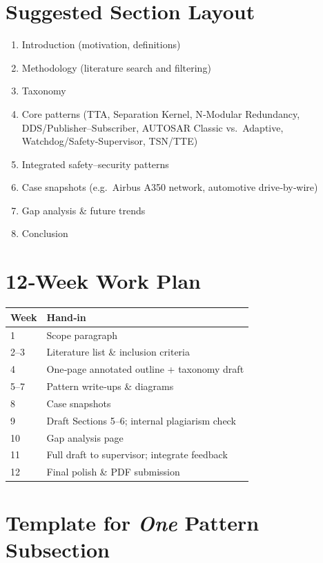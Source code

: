 \documentclass[11pt,a4paper]{article}
\begin{document}
\section{Suggested Section Layout}

\begin{enumerate}[label=\arabic*.]
  \item Introduction (motivation, definitions)
  \item Methodology (literature search and filtering)
  \item Taxonomy
  \item Core patterns (TTA, Separation Kernel, N‑Modular Redundancy, DDS/Publisher--Subscriber, AUTOSAR Classic vs.~Adaptive, Watchdog/Safety‑Supervisor, TSN/TTE)
  \item Integrated safety--security patterns
  \item Case snapshots (e.g.\ Airbus A350 network, automotive drive‑by‑wire)
  \item Gap analysis \& future trends
  \item Conclusion
\end{enumerate}

\section{12‑Week Work Plan}

\begin{center}
\begin{tabular}{@{}ll@{}}
\toprule
\textbf{Week} & \textbf{Hand‑in} \\
\midrule
1   & Scope paragraph \\
2--3 & Literature list \& inclusion criteria \\
4   & One‑page annotated outline + taxonomy draft \\
5--7 & Pattern write‑ups \& diagrams \\
8   & Case snapshots \\
9   & Draft Sections 5--6; internal plagiarism check \\
10  & Gap analysis page \\
11  & Full draft to supervisor; integrate feedback \\
12  & Final polish \& PDF submission \\
\bottomrule
\end{tabular}
\end{center}

\section{Template for \emph{One} Pattern Subsection}
\end{document}
